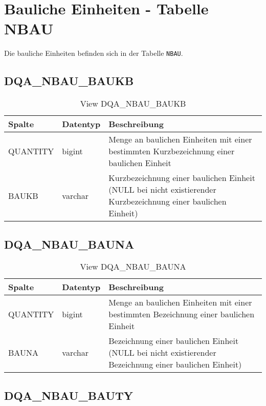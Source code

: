 \chapter{Bauliche Einheiten - Tabelle NBAU}
  Die bauliche Einheiten befinden sich in der Tabelle \texttt{NBAU}.

  \section{DQA\_NBAU\_BAUKB}

  \begin{table}[ht]
    \centering
    \caption{View DQA\_NBAU\_BAUKB}
    \label{tab:dqanbaubaukb}
    \begin{tabular}{||l|l|p{10cm}||}
      \hline
      Spalte & Datentyp & Beschreibung \\ [0.5ex] \hline \hline
QUANTITY & bigint & Menge an baulichen Einheiten mit einer bestimmten Kurzbezeichnung einer baulichen Einheit \\ \hline
BAUKB & varchar & Kurzbezeichnung einer baulichen Einheit (NULL bei nicht existierender Kurzbezeichnung einer baulichen Einheit)\\ \hline
    \end{tabular}
  \end{table}
\clearpage
  \section{DQA\_NBAU\_BAUNA}

  \begin{table}[ht]
    \centering
    \caption{View DQA\_NBAU\_BAUNA}
    \label{tab:dqanbaubauna}
    \begin{tabular}{||l|l|p{10cm}||}
      \hline
      Spalte & Datentyp & Beschreibung \\ [0.5ex] \hline \hline
QUANTITY & bigint & Menge an baulichen Einheiten mit einer bestimmten Bezeichnung einer baulichen Einheit \\ \hline
BAUNA & varchar & Bezeichnung einer baulichen Einheit (NULL bei nicht existierender Bezeichnung einer baulichen Einheit)\\ \hline
    \end{tabular}
  \end{table}

  \section{DQA\_NBAU\_BAUTY}


